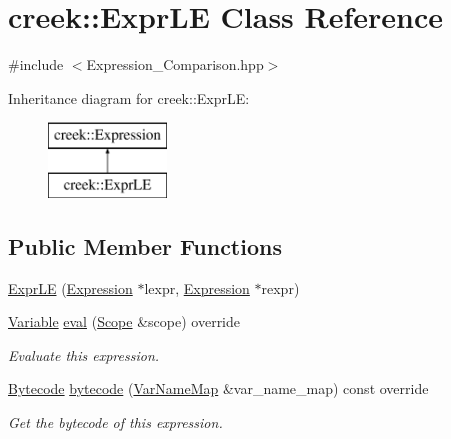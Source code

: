 \hypertarget{classcreek_1_1_expr_l_e}{}\section{creek\+:\+:Expr\+LE Class Reference}
\label{classcreek_1_1_expr_l_e}


{\ttfamily \#include $<$Expression\+\_\+\+Comparison.\+hpp$>$}

Inheritance diagram for creek\+:\+:Expr\+LE\+:\begin{figure}[H]
\begin{center}
\leavevmode
\includegraphics[height=2.000000cm]{classcreek_1_1_expr_l_e}
\end{center}
\end{figure}
\subsection*{Public Member Functions}
\begin{DoxyCompactItemize}
\item 
\hyperlink{classcreek_1_1_expr_l_e_a4ab692bd80680c8135f1d191a94e1e43}{Expr\+LE} (\hyperlink{classcreek_1_1_expression}{Expression} $\ast$lexpr, \hyperlink{classcreek_1_1_expression}{Expression} $\ast$rexpr)
\item 
\hyperlink{classcreek_1_1_variable}{Variable} \hyperlink{classcreek_1_1_expr_l_e_a223206d456000e0587d69cca65816c8a}{eval} (\hyperlink{classcreek_1_1_scope}{Scope} \&scope) override
\begin{DoxyCompactList}\small\item\em Evaluate this expression. \end{DoxyCompactList}\item 
\hyperlink{classcreek_1_1_bytecode}{Bytecode} \hyperlink{classcreek_1_1_expr_l_e_a456857de710e43dc495b5c9a1f0790bc}{bytecode} (\hyperlink{classcreek_1_1_var_name_map}{Var\+Name\+Map} \&var\+\_\+name\+\_\+map) const  override\hypertarget{classcreek_1_1_expr_l_e_a456857de710e43dc495b5c9a1f0790bc}{}\label{classcreek_1_1_expr_l_e_a456857de710e43dc495b5c9a1f0790bc}

\begin{DoxyCompactList}\small\item\em Get the bytecode of this expression. \end{DoxyCompactList}\end{DoxyCompactItemize}


